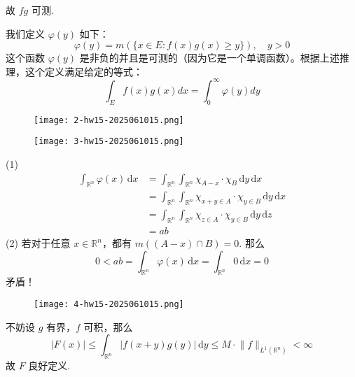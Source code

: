 故 $fg$ 可测.

我们定义 $\varphi(y)$ 如下：
\[
\varphi(y)=m(\{x \in E: f(x) g(x) \geq y\}), \quad y>0
\]
这个函数 $\varphi(y)$ 是非负的并且是可测的（因为它是一个单调函数）。根据上述推理，这个定义满足给定的等式：
\[
\int_E f(x) g(x) d x=\int_0^{\infty} \varphi(y) d y
\]
\begin{exercise}
\begin{figure}[H]
\centering
\texttt{[image: 2-hw15-2025061015.png]}
\label{}
\end{figure}
\begin{figure}[H]
\centering
\texttt{[image: 3-hw15-2025061015.png]}
\label{}
\end{figure}
\end{exercise}
(1)
\[
\begin{aligned}
\int_{\mathbb{R}^{n}}^{} \varphi(x) \, \mathrm{d}x  & =\int_{\mathbb{R}^{n}}^{} \int_{\mathbb{R}^{n}}^{} \chi_{A-x}\cdot \chi_{B} \, \mathrm{d}y  \, \mathrm{d}x   \\
 & =\int_{\mathbb{R}^{n}}^{} \int_{\mathbb{R}^{n}}^{} \chi_{x+y\in A}\cdot \chi_{y \in B} \, \mathrm{d}y  \, \mathrm{d}x  \\
 & =\int_{\mathbb{R}^{n}}^{} \int_{\mathbb{R}^{n}}^{} \chi_{z\in A}\cdot \chi _{y\in B} \, \mathrm{d}y \, \mathrm{d}z \\
  & =ab
\end{aligned}
\]
(2)
若对于任意 $x\in \mathbb{R}^{n}$，都有 $m((A-x)\cap B)=0$. 那么
\[
0<ab=\int_{\mathbb{R}^{n}}^{} \varphi(x) \, \mathrm{d}x =\int_{\mathbb{R}^{n}}^{} 0 \, \mathrm{d}x =0
\]
矛盾！

\begin{exercise}
\begin{figure}[H]
\centering
\texttt{[image: 4-hw15-2025061015.png]}
\label{}
\end{figure}
\end{exercise}
不妨设 $g$ 有界，$f$ 可积，那么
\[
\lvert F(x) \rvert \leq \int_{\mathbb{R}^{n}}^{} \lvert f(x+y)g(y) \rvert  \, \mathrm{d}y \leq M\cdot\lVert f \rVert _{L^{1}(\mathbb{R}^{n})}<\infty
\]
故 $F$ 良好定义.

